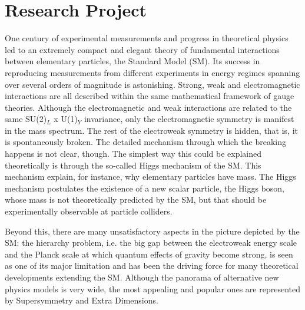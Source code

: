 \documentclass[10pt, a4paper]{article}
\begin{document}
\reversemarginpar

\section*{Research Project}

One century of experimental measurements and progress in theoretical physics 
led to an extremely compact and elegant theory of fundamental interactions between 
elementary particles, the Standard Model (SM). Its success in reproducing 
measurements from different experiments in energy regimes spanning 
over several orders of magnitude is astonishing. 
Strong, weak and electromagnetic interactions are all described within the 
same mathematical framework of gauge theories. Although the electromagnetic and weak 
interactions are related to the same SU(2)$_L$ x U(1)$_Y$ invariance, only 
the electromagnetic symmetry is manifest in the mass spectrum. 
The rest of the electroweak symmetry is hidden, that is, it is spontaneously broken. 
The detailed mechanism through which the breaking happens is not clear, though. 
The simplest way this could be explained theoretically is through the 
so-called Higgs mechanism of the SM. This mechanism explain, for instance, why 
elementary particles have mass. The Higgs mechanism postulates the existence 
of a new scalar particle, the Higgs boson, whose mass is not theoretically predicted by 
the SM, but that should be experimentally observable at particle colliders. 

Beyond this, there are many unsatisfactory aspects in the picture depicted 
by the SM: the hierarchy problem, i.e. the big gap between the electroweak 
energy scale and the Planck scale at which quantum effects of gravity become strong, 
is seen as one of its major limitation and has been the driving force for many 
theoretical developments extending the SM. Although the panorama of 
alternative new physics models is very wide, the most appealing and 
popular ones are represented by Supersymmetry and Extra Dimensions. 
\end{document}
